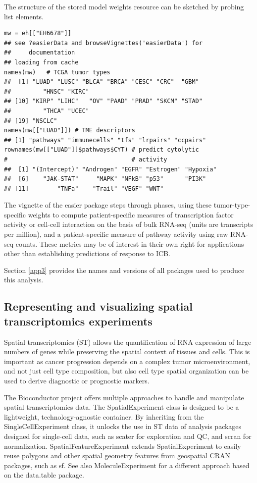 \documentclass[graybox]{svmult}
\begin{document}
The structure of the stored model weights resource can be sketched by probing list elements.

\begin{shaded}
\begin{verbatim}
mw = eh[["EH6678"]]
## see ?easierData and browseVignettes('easierData') for 
##     documentation
## loading from cache
names(mw)   # TCGA tumor types
##  [1] "LUAD" "LUSC" "BLCA" "BRCA" "CESC" "CRC"  "GBM"  
##         "HNSC" "KIRC"
## [10] "KIRP" "LIHC"   "OV" "PAAD" "PRAD" "SKCM" "STAD" 
##         "THCA" "UCEC"
## [19] "NSCLC"
names(mw[["LUAD"]]) # TME descriptors
## [1] "pathways" "immunecells" "tfs" "lrpairs" "ccpairs"
rownames(mw[["LUAD"]]$pathways$CYT) # predict cytolytic 
#                                   # activity
##  [1] "(Intercept)" "Androgen" "EGFR" "Estrogen" "Hypoxia"
##  [6]    "JAK-STAT"     "MAPK" "NFkB" "p53"      "PI3K"
## [11]        "TNFa"    "Trail" "VEGF" "WNT"
\end{verbatim}
\end{shaded}


The vignette of the easier package steps through phases,
using these tumor-type-specific weights to compute patient-specific measures
of transcription factor activity or cell-cell interaction on the basis of bulk
RNA-seq (units are transcripts per million), and a patient-specific
measure of pathway activity using raw RNA-seq counts. These metrics
may be of interest in their own right for applications other than
establishing predictions of response to ICB.

Section \ref{app3} provides the names and versions of all packages
used to produce this analysis.


\subsection{Representing and visualizing spatial transcriptomics experiments}\label{representing-and-visualizing-spatial-transcriptomics-experiments}

Spatial transcriptomics (ST) allows the quantification of RNA expression of large numbers of genes while preserving the spatial context of tissues and cells. This is important as cancer progression depends on a complex tumor microenvironment, and not just cell type composition, but also cell type spatial organization can be used to derive diagnostic or prognostic markers.

The Bioconductor project offers multiple approaches to handle and manipulate
spatial transcriptomics data.
The SpatialExperiment class \cite{rig22} %
is designed to be a lightweight,
technology-agnostic container. By inheriting from the
SingleCellExperiment class, it unlocks the use in ST data of
analysis packages designed for single-cell data, such as scater for exploration
and QC, and scran for normalization.
SpatialFeatureExperiment \cite{moses23} %
extends SpatialExperiment to easily
reuse polygons and other spatial geometry features from geospatial CRAN
packages, such as sf. See also MoleculeExperiment \cite{Couto2023} %
for a different
approach based on the data.table package.
\end{document}
